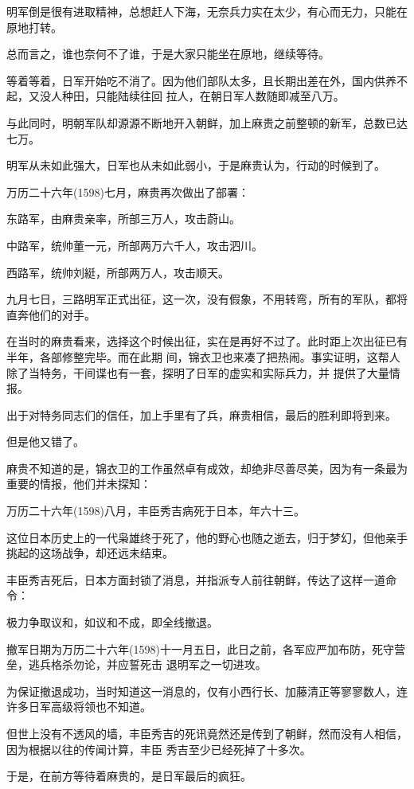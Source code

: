 \documentclass[11pt,a4paper,onecolumn]{article}
\begin{document}
明军倒是很有进取精神，总想赶人下海，无奈兵力实在太少，有心而无力，只能在原地打转。

总而言之，谁也奈何不了谁，于是大家只能坐在原地，继续等待。

等着等着，日军开始吃不消了。因为他们部队太多，且长期出差在外，国内供养不起，又没人种田，只能陆续往回
拉人，在朝日军人数随即减至八万。

与此同时，明朝军队却源源不断地开入朝鲜，加上麻贵之前整顿的新军，总数已达七万。

明军从未如此强大，日军也从未如此弱小，于是麻贵认为，行动的时候到了。

万历二十六年(1598)七月，麻贵再次做出了部署：

东路军，由麻贵亲率，所部三万人，攻击蔚山。

中路军，统帅董一元，所部两万六千人，攻击泗川。

西路军，统帅刘綎，所部两万人，攻击顺天。

九月七日，三路明军正式出征，这一次，没有假象，不用转弯，所有的军队，都将直奔他们的对手。

在当时的麻贵看来，选择这个时候出征，实在是再好不过了。此时距上次出征已有半年，各部修整完毕。而在此期
间，锦衣卫也来凑了把热闹。事实证明，这帮人除了当特务，干间谍也有一套，探明了日军的虚实和实际兵力，并
提供了大量情报。

出于对特务同志们的信任，加上手里有了兵，麻贵相信，最后的胜利即将到来。

但是他又错了。

麻贵不知道的是，锦衣卫的工作虽然卓有成效，却绝非尽善尽美，因为有一条最为重要的情报，他们并未探知：

万历二十六年(1598)八月，丰臣秀吉病死于日本，年六十三。

这位日本历史上的一代枭雄终于死了，他的野心也随之逝去，归于梦幻，但他亲手挑起的这场战争，却还远未结束。

丰臣秀吉死后，日本方面封锁了消息，并指派专人前往朝鲜，传达了这样一道命令：

极力争取议和，如议和不成，即全线撤退。

撤军日期为万历二十六年(1598)十一月五日，此日之前，各军应严加布防，死守营垒，逃兵格杀勿论，并应誓死击
退明军之一切进攻。

为保证撤退成功，当时知道这一消息的，仅有小西行长、加藤清正等寥寥数人，连许多日军高级将领也不知道。

但世上没有不透风的墙，丰臣秀吉的死讯竟然还是传到了朝鲜，然而没有人相信，因为根据以往的传闻计算，丰臣
秀吉至少已经死掉了十多次。

于是，在前方等待着麻贵的，是日军最后的疯狂。
\end{document}
